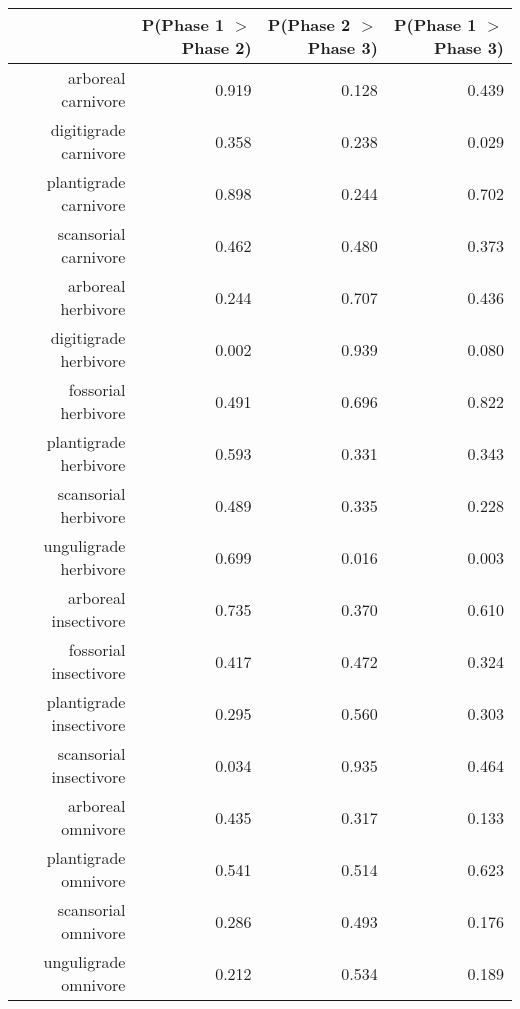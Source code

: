 \begin{table}[ht]
\centering
\begin{tabular}{rrrr}
  \hline
 & P(Phase 1 $>$ Phase 2) & P(Phase 2 $>$ Phase 3) & P(Phase 1 $>$ Phase 3) \\ 
  \hline
arboreal carnivore & 0.919 & 0.128 & 0.439 \\ 
  digitigrade carnivore & 0.358 & 0.238 & 0.029 \\ 
  plantigrade carnivore & 0.898 & 0.244 & 0.702 \\ 
  scansorial carnivore & 0.462 & 0.480 & 0.373 \\ 
  arboreal herbivore & 0.244 & 0.707 & 0.436 \\ 
  digitigrade herbivore & 0.002 & 0.939 & 0.080 \\ 
  fossorial herbivore & 0.491 & 0.696 & 0.822 \\ 
  plantigrade herbivore & 0.593 & 0.331 & 0.343 \\ 
  scansorial herbivore & 0.489 & 0.335 & 0.228 \\ 
  unguligrade herbivore & 0.699 & 0.016 & 0.003 \\ 
  arboreal insectivore & 0.735 & 0.370 & 0.610 \\ 
  fossorial insectivore & 0.417 & 0.472 & 0.324 \\ 
  plantigrade insectivore & 0.295 & 0.560 & 0.303 \\ 
  scansorial insectivore & 0.034 & 0.935 & 0.464 \\ 
  arboreal omnivore & 0.435 & 0.317 & 0.133 \\ 
  plantigrade omnivore & 0.541 & 0.514 & 0.623 \\ 
  scansorial omnivore & 0.286 & 0.493 & 0.176 \\ 
  unguligrade omnivore & 0.212 & 0.534 & 0.189 \\ 
   \hline
\end{tabular}
\label{tab:surv_plant}
\end{table}
